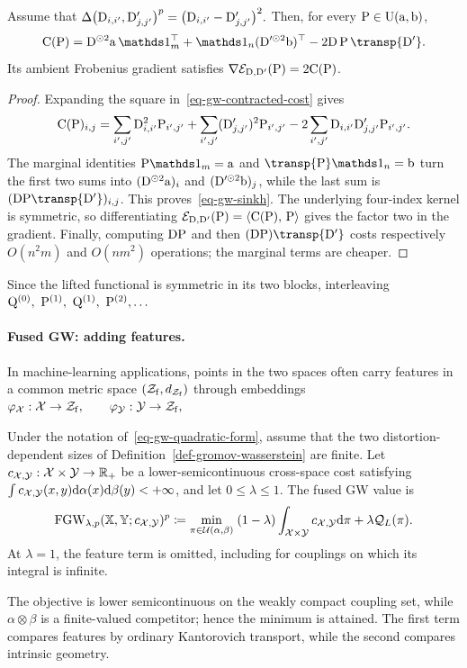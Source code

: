 \begin{prop}\label{prop-gw-squared-cost-update}
Assume that
\(\Delta\bigl(\mathrm{D}_{i,i'},\mathrm{D}'_{j,j'}\bigr)^p = \bigl(\mathrm{D}_{i,i'}-\mathrm{D}'_{j,j'}\bigr)^2.\)
Then, for every $\mathrm{P}\in\mathrm{U}(\mathrm{a},\mathrm{b})$,
\begin{equation}\label{eq-gw-sinkh}
\C(\P)
=
\distD^{\odot2}\a\,\ones_m^\top
+
\ones_n(\distD'^{\odot2}\b)^\top
-
2\distD\,\P\,\transp{\distD'}.
\end{equation}
Its ambient Frobenius gradient satisfies
$\nabla\mathcal{E}_{\mathrm{D},\mathrm{D}'}(\mathrm{P})=2\mathrm{C}(\mathrm{P})$.
\end{prop}
\begin{proof}
Expanding the square in~\eqref{eq-gw-contracted-cost} gives
\[
\mathrm{C}(\mathrm{P})_{i,j}
=
\sum_{i',j'}\mathrm{D}_{i,i'}^2\mathrm{P}_{i',j'}
+
\sum_{i',j'}(\mathrm{D}'_{j,j'})^2\mathrm{P}_{i',j'}
-
2\sum_{i',j'}\mathrm{D}_{i,i'}\mathrm{D}'_{j,j'}\mathrm{P}_{i',j'}.
\]
The marginal identities $\P\ones_m=\a$ and $\transp{\P}\ones_n=\b$ turn the first two sums into $(\mathrm{D}^{\odot2}\mathrm{a})_i$ and $(\mathrm{D}'^{\odot2}\mathrm{b})_j$, while the last sum is $(\distD\P\transp{\distD'})_{i,j}$. This proves~\eqref{eq-gw-sinkh}. The underlying four-index kernel is symmetric, so differentiating
$\mathcal{E}_{\mathrm{D},\mathrm{D}'}(\mathrm{P})=\langle \mathrm{C}(\mathrm{P}),\,\mathrm{P}\rangle$
gives the factor two in the gradient. Finally, computing $\mathrm{D}\mathrm{P}$ and then $(\distD\P)\transp{\distD'}$ costs respectively $O(n^2m)$ and $O(nm^2)$ operations; the marginal terms are cheaper.
\end{proof}
Since the lifted functional is symmetric in its two blocks, interleaving
\(\Q^{(0)},\ \P^{(1)},\ \Q^{(1)},\ \P^{(2)},\ldots\)
\paragraph{Fused GW: adding features.}
In machine-learning applications, points in the two spaces often carry features in a common metric space $(\mathcal Z_{\mathrm f},d_{\mathcal Z_{\mathrm f}})$ through embeddings
\(\varphi_{\mathcal{X}}:\mathcal{X}\to\mathcal Z_{\mathrm f}, \qquad \varphi_{\mathcal{Y}}:\mathcal{Y}\to\mathcal Z_{\mathrm f},\)
\begin{defn}\label{def-fused-gromov-wasserstein}
Under the notation of~\eqref{eq-gw-quadratic-form}, assume that the two distortion-dependent sizes of Definition~\ref{def-gromov-wasserstein} are finite. Let
$c_{\mathcal{X},\mathcal{Y}}:\mathcal{X}\times\mathcal{Y}\to\mathbb{R}_+$ be a lower-semicontinuous cross-space cost satisfying
$\int c_{\mathcal{X},\mathcal{Y}}(x,y)\mathrm{d}\alpha(x)\mathrm{d}\beta(y)<+\infty$, and let $0\leq\lambda\leq1$. The fused GW value is
\begin{equation}\label{eq-fused-gromov-wasserstein}
\operatorname{FGW}_{\lambda,p}(\mathbb{X},\mathbb{Y};c_{\mathcal{X},\mathcal{Y}})^p
\coloneqq
\underset{\pi\in\mathcal{U}(\alpha,\beta)}{\min}\;
(1-\lambda)\int_{\mathcal{X}\times\mathcal{Y}}c_{\mathcal{X},\mathcal{Y}}\mathrm{d}\pi
+
\lambda\mathcal Q_L(\pi).
\end{equation}
At $\lambda=1$, the feature term is omitted, including for couplings on which its integral is infinite.
\end{defn}
The objective is lower semicontinuous on the weakly compact coupling set, while $\alpha\otimes\beta$ is a finite-valued competitor; hence the minimum is attained. The first term compares features by ordinary Kantorovich transport, while the second compares intrinsic geometry.

